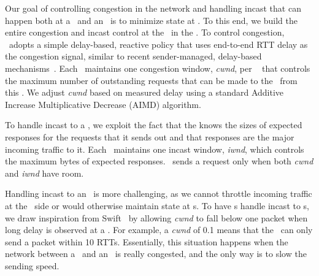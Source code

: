 Our goal of controlling congestion in the network and handling incast that can happen both at a \CN\ and an \MN\ is to minimize state at \MN.
To this end, we build the entire congestion and incast control at the \CN\ in the \syslib.
To control congestion, \syslib\ adopts a simple delay-based, reactive policy that uses end-to-end RTT delay as the congestion signal, similar to recent sender-managed, delay-based mechanisms~\cite{mittal2015timely,swift-sigcomm,1RMA}.
Each \CN\ maintains one congestion window, \textit{cwnd}, per \MN\ 
that controls the maximum number of outstanding requests that can be made to the \MN\ from this \CN.
We adjust \textit{cwnd} based on measured delay using a standard Additive Increase Multiplicative Decrease (AIMD) algorithm.

To handle incast to a \CN, we exploit the fact that the \CN{} knows the sizes of expected responses for the requests that it sends out and that responses are the major incoming traffic to it.
Each \syslib\ maintains one incast window, \textit{iwnd}, which controls the maximum bytes of expected responses. \syslib\ sends a request only when both \textit{cwnd} and \textit{iwnd} have room.

Handling incast to an \MN\ is more challenging, as we cannot throttle incoming traffic at the \MN\ side or would otherwise maintain state at \MN{}s.
To have \CN{}s handle incast to \MN{}s, we draw inspiration from Swift~\cite{swift-sigcomm} by allowing \textit{cwnd} to fall below one packet when long delay is observed at a \CN. For example, a \textit{cwnd} of 0.1 means that the \CN\ can only send a packet within 10 RTTs.
Essentially, this situation happens when the network between a \CN\ and an \MN\ is really congested, and the only way is to slow the sending speed.

